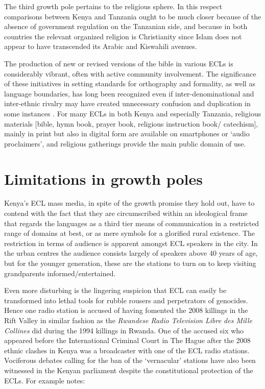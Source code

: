 \documentclass[output=paper,colorlinks,citecolor=brown]{langscibook}
\begin{document}
The third growth pole pertains to the religious sphere. In this respect comparisons between Kenya and Tanzania ought to be much closer because of the absence of government regulation on the Tanzanian side, and because in both countries the relevant organized religion is Christianity since Islam does not appear to have transcended its Arabic and Kiswahili avenues. 
 
The production of new or revised versions of the bible in various ECLs is considerably vibrant, often with active community involvement. The significance of these initiatives in setting standards for orthography and formality, as well as language boundaries, has long been recognized even if inter-denominational and inter-ethnic rivalry may have created unnecessary confusion and duplication in some instances \citep[242]{Kioko2017}. For many ECLs in both Kenya and especially Tanzania, religious materials [bible, hymn book, prayer book, religious instruction book/ catechism], mainly in print but also in digital form are available on smartphones or ‘audio proclaimers’, and religious gatherings provide the main public domain of use. 

\section{Limitations in growth poles}\label{sec:kioko:4}

Kenya’s ECL mass media, in spite of the growth promise they hold out, have to contend with the fact that they are circumscribed within an ideological frame that regards the languages as a third tier means of communication in a restricted range of domains at best, or as mere symbols for a glorified rural existence.  The restriction in terms of audience is apparent amongst ECL speakers in the city.  In the urban centres the audience consists largely of speakers above 40 years of age, but for the younger generation, these are the stations to turn on to keep visiting grandparents informed/entertained.  

Even more disturbing is the lingering suspicion that ECL can easily be transformed into lethal tools for rubble rousers and perpetrators of genocides. Hence one radio station is accused of having fomented the 2008 killings in the Rift Valley in similar fashion as the \textit{Rwandese Radio Television Libre des Mille Collines} did during the 1994 killings in Rwanda. One of the accused six who appeared before the International Criminal Court in The Hague after the 2008 ethnic clashes in Kenya was a broadcaster with one of the ECL radio stations. Vociferous debates calling for the ban of the ‘vernacular’ stations have also been witnessed in the Kenyan parliament despite the constitutional protection of the ECLs. For example \cite[123]{Kioko2013} notes: 
\end{document}
